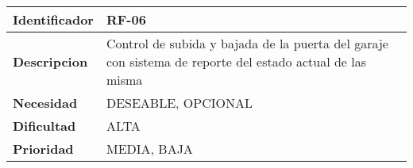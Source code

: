 \begin{center}
    \begin{tabular}{|p{2.6cm}|p{12cm}|}
    \hline
    \textbf{Identificador} & RF-06\\
    \hline
    \textbf{Descripcion} & Control de subida y bajada de la puerta del garaje con sistema de reporte del estado actual de las misma\\
    \hline
    \textbf{Necesidad} & DESEABLE, OPCIONAL\\
    \hline
    \textbf{Dificultad} & ALTA\\
    \hline
    \textbf{Prioridad} & MEDIA, BAJA\\
    \hline
    \end{tabular}
\end{center}
